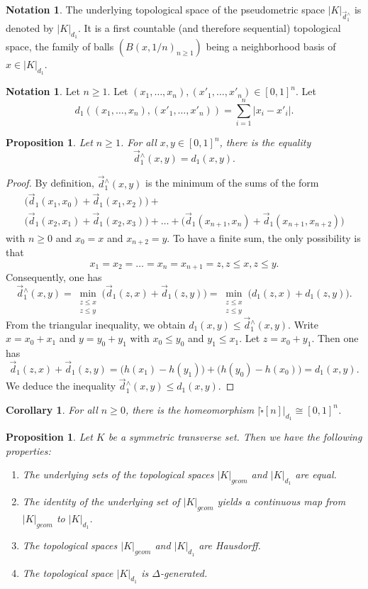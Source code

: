 \documentclass[a4paper,12pt]{amsart}
\renewcommand{\vec}{\overrightarrow}
\newtheorem{prop}[thm]{Proposition}
\newtheorem{cor}[thm]{Corollary}
\newcommand{\bp}{\begin{prop}}
\newcommand{\ep}{\end{prop}}
\newcommand{\bpf}{\begin{proof}}
\newcommand{\epf}{\end{proof}}
\theoremstyle{definition}
\newtheorem{nota}[thm]{Notation}
\newcommand{\iso}{\cong}
\renewcommand{\leq}{\leqslant}
\renewcommand{\geq}{\geqslant}
\newcommand{\vd}{\vec{d}\!_1}
\begin{document}
\begin{nota}
	The underlying topological space of the pseudometric space $|K|_{\vd^\wedge}$ is denoted by $|K|_{d_1}$. It is a first countable (and therefore sequential) topological space, the family of balls $(B(x,1/n)_{n \geq 1})$ being a neighborhood basis of $x\in |K|_{d_1}$.
\end{nota}

\begin{nota}
	Let $n\geq 1$. Let $(x_1,\dots,x_n),(x'_1,\dots,x'_n)\in [0,1]^n$. Let
	\[
	d_1((x_1,\dots,x_n),(x'_1,\dots,x'_n)) = \sum\limits_{i=1}^{n} |x_i-x'_i|.
	\]
\end{nota}


\bp
Let $n\geq 1$. For all $x,y\in [0,1]^n$, there is the equality \[\vd^\wedge(x,y)= d_1(x,y).\] 
\ep

\bpf 
By definition, $\vd^\wedge(x,y)$ is the minimum of the sums of the form 
\begin{multline*}
	\big(\vd(x_1,x_0)+\vd(x_1,x_2)\big) + \\\big(\vd(x_2,x_1)+\vd(x_2,x_3)\big)+\dots + \big(\vd(x_{n+1},x_n)+\vd(x_{n+1},x_{n+2})\big)
\end{multline*}
with $n\geq 0$ and $x_0=x$ and $x_{n+2}=y$. To have a finite sum, the only possibility is that 
\[
x_1=x_2=\dots =x_n=x_{n+1}=z, z\leq x, z\leq y.
\]
Consequently, one has 
\[
\vd^\wedge(x,y) = \min_{\substack{z\leq x\\z\leq y}} \big(\vd(z,x) + \vd(z,y)\big) = \min_{\substack{z\leq x\\z\leq y}} \big(d_1(z,x) + d_1(z,y)\big).
\]
From the triangular inequality, we obtain $d_1(x,y)\leq \vd^\wedge(x,y)$. Write $x=x_0+x_1$ and $y=y_0+y_1$ with $x_0\leq y_0$ and $y_1\leq x_1$. Let $z=x_0+y_1$. Then one has 
\[
\vd(z,x)+\vd(z,y) = \big(h(x_1)-h(y_1)\big) + \big(h(y_0)-h(x_0)\big) = d_1(x,y).
\]
We deduce the inequality $\vd^\wedge(x,y)\leq d_1(x,y)$.
\epf


\begin{cor} \label{samecube}
	For all $n\geq 0$, there is the homeomorphism $|\widehat{\square}[n]|_{d_1} \iso [0,1]^n$.
\end{cor}


\bp \label{comp}
Let $K$ be a symmetric transverse set. Then we have the following properties:
\begin{enumerate}
	\item The underlying sets of the topological spaces $|K|_{geom}$ and $|K|_{d_1}$ are equal.
	\item The identity of the underlying set of $|K|_{geom}$ yields a continuous map from $|K|_{geom}$ to $|K|_{d_1}$.
	\item The topological spaces $|K|_{geom}$ and $|K|_{d_1}$ are Hausdorff.
	\item The topological space $|K|_{d_1}$ is $\Delta$-generated.
\end{enumerate}
\ep
\end{document}
